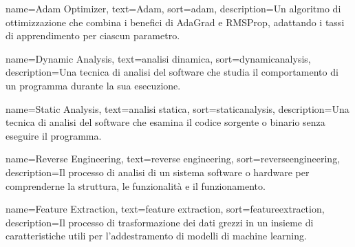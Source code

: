  {
    name={Adam Optimizer},
    text={Adam},
    sort={adam},
    description={Un algoritmo di ottimizzazione che combina i benefici di AdaGrad e RMSProp, adattando i tassi di apprendimento per ciascun parametro.}
}





 {
    name={Dynamic Analysis},
    text={analisi dinamica},
    sort={dynamicanalysis},
    description={Una tecnica di analisi del software che studia il comportamento di un programma durante la sua esecuzione.}
}

 {
    name={Static Analysis},
    text={analisi statica},
    sort={staticanalysis},
    description={Una tecnica di analisi del software che esamina il codice sorgente o binario senza eseguire il programma.}
}

 {
    name={Reverse Engineering},
    text={reverse engineering},
    sort={reverseengineering},
    description={Il processo di analisi di un sistema software o hardware per comprenderne la struttura, le funzionalità e il funzionamento.}
}

 {
    name={Feature Extraction},
    text={feature extraction},
    sort={featureextraction},
    description={Il processo di trasformazione dei dati grezzi in un insieme di caratteristiche utili per l'addestramento di modelli di machine learning.}
}


